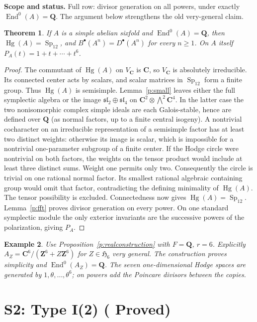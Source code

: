 \documentclass[10pt,reqno]{article}
\theoremstyle{emphasizedplain}
\DeclareRobustCommand{\provedstatus}{%
  \texorpdfstring{\textcolor{ProvedGreen}{\textbf{Proved}}}{Proved}}
\newtheorem{theorem}{Theorem}[section]
\theoremstyle{emphasizeddefinition}
\newtheorem{example}[theorem]{Example}
\theoremstyle{emphasizeddefinition}
\DeclareMathOperator{\End}{End}
\DeclareMathOperator{\Hg}{Hg}
\DeclareMathOperator{\Sp}{Sp}
\newcommand{\Q}{\mathbf Q}
\newcommand{\C}{\mathbf C}
\newcommand{\Z}{\mathbf Z}
\newcommand{\B}{B}
\newcommand{\D}{D}
\newcommand{\status}[1]{%
  \par\nobreak\smallskip\noindent
  {\setlength{\fboxsep}{7pt}%
   \colorbox{ScopeBackground}{%
    \parbox{\dimexpr\linewidth-2\fboxsep\relax}{%
     \small\textbf{\textcolor{HeadingInk}{Scope and status.}} #1}}}%
  \par\nobreak\medskip}
\renewcommand{\small}{\fontsize{8.4}{10}\selectfont}
\begin{document}
\status{Full row: divisor generation on all powers, under exactly
$\End^0(A)=\Q$. The argument below strengthens the old very-general claim.}
\begin{theorem}\label{t:S1}
If $A$ is a simple abelian sixfold and $\End^0(A)=\Q$, then
$\Hg(A)=\Sp_{12}$, and $\B^\bullet(A^n)=\D^\bullet(A^n)$ for every $n\geq1$.
On $A$ itself $P_A(t)=1+t+\cdots+t^6$.
\end{theorem}
\begin{proof}
The commutant of $\Hg(A)$ on $V_\C$ is $\C$, so $V_\C$ is absolutely
irreducible. Its connected center acts by scalars, and scalar matrices in
$\Sp_{12}$ form a finite group. Thus $\Hg(A)$ is semisimple.
Lemma~\ref{p:small} leaves either the full symplectic algebra or the image
$\mathfrak{sl}_2\oplus\mathfrak{sl}_4$ on
$\C^2\otimes\bigwedge^2\C^4$.
In the latter case the two nonisomorphic complex simple ideals are each
Galois-stable, hence are defined over $\Q$ (as normal factors, up to a finite
central isogeny). A nontrivial cocharacter on an irreducible representation
of a semisimple factor has at least two distinct weights: otherwise its
image is scalar, which is impossible for a nontrivial one-parameter
subgroup of a finite center. If the Hodge circle were nontrivial on both
factors, the weights on the tensor product would include at least three
distinct sums. Weight one permits only two. Consequently the circle is
trivial on one rational normal factor. Its smallest rational algebraic
containing group would omit that factor, contradicting the defining
minimality of $\Hg(A)$. The tensor possibility is excluded.
Connectedness now gives $\Hg(A)=\Sp_{12}$. Lemma~\ref{p:fft} proves divisor
generation on every power. On one standard symplectic module the only
exterior invariants are the successive powers of the polarization, giving
$P_A$.
\end{proof}
\begin{example}
Use Proposition~\ref{p:realconstruction} with $F=\Q$, $r=6$.
Explicitly $A_Z=\C^6/(\Z^6+Z\Z^6)$ for $Z\in\mathfrak H_6$ very general.
The construction proves simplicity and $\End^0(A_Z)=\Q$. The seven
one-dimensional Hodge spaces are generated by $1,\theta,\ldots,\theta^6$;
on powers add the Poincare divisors between the copies.
\end{example}
\section{S2: Type I(2) (\provedstatus)}\label{sec:S2}
\end{document}
